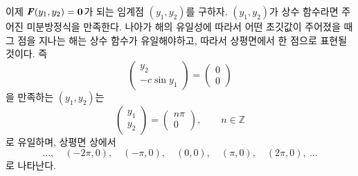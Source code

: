 \documentclass[../engineering_mathematics_lecture_note.tex]{subfiles}
\begin{document}
\begin{example}
    이제 $\bm{\mathit{F}}(y_1, y_2) = \bm{\mathrm{0}}$가 되는 임계점 $(y_1, y_2)$를 구하자.
    $(y_1, y_2)$가 상수 함수라면 주어진 미분방정식을 만족한다.
    나아가 해의 유일성에 따라서 어떤 초깃값이 주어졌을 때 그 점을 지나는 해는 상수 함수가 유일해야하고, 따라서 상평면에서 한 점으로 표현될 것이다.
    즉
    \begin{equation*}
        \begin{pmatrix}
            y_2 \\ -c \sin y_1
        \end{pmatrix} = \begin{pmatrix}
            0 \\ 0
        \end{pmatrix}
    \end{equation*}
    을 만족하는 $(y_1, y_2)$는
    \begin{equation*}
        \begin{pmatrix}
            y_1 \\ y_2
        \end{pmatrix} = \begin{pmatrix}
            n\pi \\ 0
        \end{pmatrix}, \qquad n \in \mathbb Z
    \end{equation*}
    로 유일하며, 상평면 상에서
    \begin{equation*}
        \dots, \quad  (-2\pi, 0), \quad (-\pi, 0),\quad (0, 0),\quad (\pi, 0),\quad (2\pi, 0),\ \dots
    \end{equation*}
    로 나타난다.
    

\end{example}
\end{document}
